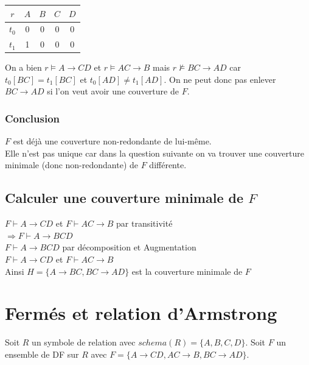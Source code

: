 \documentclass[10pt,a4paper,twoside]{article}
\begin{document}
\begin{tabular}{c|cccc}
$r$ & $A$ & $B$ & $C$ & $D$ \\ 
\hline 
$t_{0}$ & 0 & 0 & 0 & 0 \\ 
$t_{1}$ & 1 & 0 & 0 & 0 \\ 
\end{tabular}

On a bien $r \models A \rightarrow CD$ et $r \models AC \rightarrow B$ mais $r \not\models BC \rightarrow AD$ car $t_{0}[BC] = t_{1}[BC]$ et $t_{0}[AD] \neq t_{1}[AD]$. On ne peut donc pas enlever $BC\rightarrow AD$ si l'on veut avoir une couverture de $F$.

\subsubsection{Conclusion}
$F$ est déjà une couverture non-redondante de lui-même.\\
Elle n'est pas unique car dans la question suivante on va trouver une couverture minimale (donc non-redondante) de $F$ différente.

\subsection{Calculer une couverture minimale de $F$}
$F\vdash A \rightarrow CD$ et $F\vdash AC \rightarrow B$ par transitivité\\
$\Rightarrow F\vdash A \rightarrow BCD$ \\
$F\vdash A \rightarrow BCD$ par décomposition et Augmentation\\
$F\vdash A \rightarrow CD$ et $F\vdash AC \rightarrow B$\\

Ainsi $H=\{A \rightarrow BC, BC\rightarrow AD\}$ est la couverture minimale de $F$

\section{Fermés et relation d'Armstrong}
Soit $R$ un symbole de relation avec $schema(R)=\{A,B,C,D\}$. Soit $F$ un ensemble de DF sur $R$ avec $F=\{A\rightarrow CD, AC \rightarrow B, BC \rightarrow AD\}$.
\end{document}
